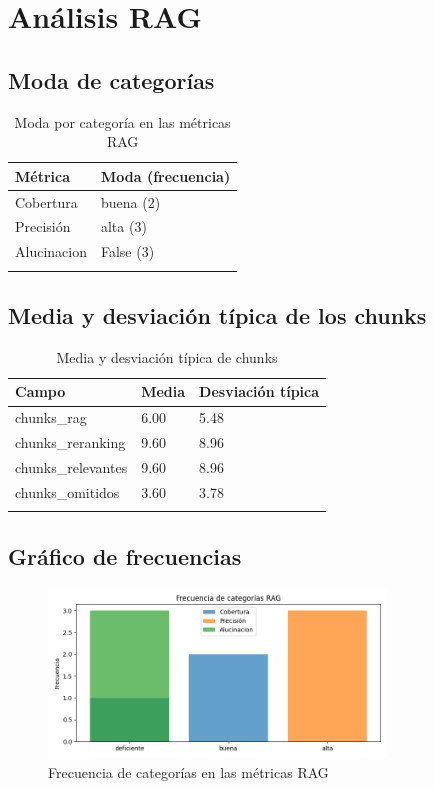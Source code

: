 \documentclass{article}
\begin{document}
\section*{Análisis RAG}
\subsection*{Moda de categorías}
\begin{table}[H]
\centering
\begin{tabular}{ll}
\toprule
\textbf{Métrica} & \textbf{Moda (frecuencia)} \\
\midrule
Cobertura & buena (2) \\
Precisión & alta (3) \\
Alucinacion & False (3) \\
\bottomrule\n\end{tabular}\n\caption{Moda por categoría en las métricas RAG}\n\end{table}\n\subsection*{Media y desviación típica de los chunks}
\begin{table}[H]
\centering
\begin{tabular}{lll}
\toprule
\textbf{Campo} & \textbf{Media} & \textbf{Desviación típica} \\
\midrule
chunks\_rag & 6.00 & 5.48 \\
chunks\_reranking & 9.60 & 8.96 \\
chunks\_relevantes & 9.60 & 8.96 \\
chunks\_omitidos & 3.60 & 3.78 \\
\bottomrule\n\end{tabular}\n\caption{Media y desviación típica de chunks}\n\end{table}\n
\subsection*{Gráfico de frecuencias}
\begin{figure}[H]
\centering
\includegraphics[width=0.8\textwidth]{../graficos/frecuencias_rag.png}
\caption{Frecuencia de categorías en las métricas RAG}
\end{figure}
\end{document}
